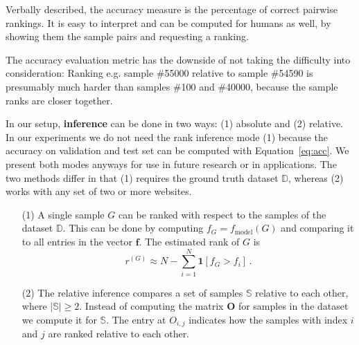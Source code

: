 Verbally described, the accuracy measure is the percentage of correct pairwise rankings. It is easy to interpret and can be computed for humans as well, by showing them the sample pairs and requesting a ranking.

The accuracy evaluation metric has the downside of not taking the difficulty into consideration: Ranking e.g. sample \#55000 relative to sample \#54590 is presumably much harder than samples \#100 and \#40000, because the sample ranks are closer together.

In our setup, \textbf{inference} can be done in two ways: (1) absolute and (2) relative. In our experiments we do not need the rank inference mode (1) because the accuracy on validation and test set can be computed with Equation~\ref{eq:acc}. We present both modes anyways for use in future research or in applications. The two methods differ in that (1) requires the ground truth dataset $\mathbb{D}$, whereas (2) works with any set of two or more websites.

\begin{enumerate}
    \item[(1)] A single sample $G$ can be ranked with respect to the samples of the dataset $\mathbb{D}$. This can be done by computing $f_G=f_\text{model}(G)$ and comparing it to all entries in the vector $\bm{f}$. The estimated rank of $G$ is \begin{equation}
        \label{eq:inference}
        r^{(G)}\approx N-\sum_{i=1}^N\bm{1}\left[f_G>f_i\right]\,.
    \end{equation}
    \item[(2)] The relative inference compares a set of samples $\mathbb{S}$ relative to each other, where $\left\lvert\mathbb{S}\right\rvert\ge2$. Instead of computing the matrix $\bm{O}$ for samples in the dataset we compute it for $\mathbb{S}$. The entry at $O_{i,j}$ indicates how the samples with index $i$ and $j$ are ranked relative to each other.
\end{enumerate}
